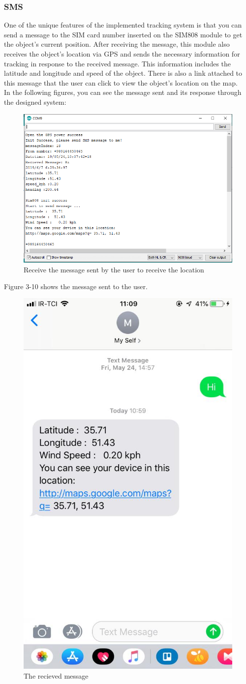 \subsubsection{SMS}
One of the unique features of the implemented tracking system is that you can send a message to the SIM card number inserted on the SIM808 module to get the object's current position. After receiving the message, this module also receives the object's location via GPS and sends the necessary information for tracking in response to the received message. This information includes the latitude and longitude and speed of the object. There is also a link attached to this message that the user can click to view the object's location on the map. \\
\newpage
In the following figures, you can see the message sent and its response through the designed system:
\begin{figure}[!h]
	\centerline{\includegraphics[width=.9\textwidth]{msg}}
	\caption{Receive the message sent by the user to receive the location}
\end{figure}
\newpage
Figure 3-10 shows the message sent to the user.
\begin{figure}[!h]
	\centerline{\includegraphics[width=.3\textwidth]{sms}}
	\caption{The recieved message}
\end{figure}
